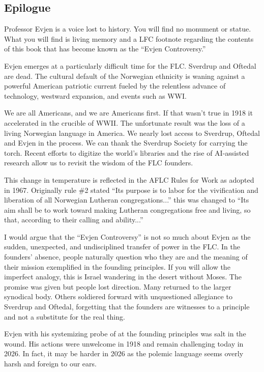\subsection{Epilogue}

Professor Evjen is a voice lost to history. You will find no monument or statue. What you will find is living memory and a LFC footnote regarding the contents of this book that has become known as the ``Evjen Controversy.'' 

Evjen emerges at a particularly difficult time for the FLC. Sverdrup and Oftedal are dead. The cultural default of the Norwegian ethnicity is waning against a powerful American patriotic current fueled by the relentless advance of technology, westward expansion, and events such as WWI. 

We are all Americans, and we are Americans first. If that wasn't true in 1918 it accelerated in the crucible of WWII. The unfortunate result was the loss of a living Norwegian language in America. We nearly lost access to Sverdrup, Oftedal and Evjen in the process. We can thank the Sverdrup Society for carrying the torch. Recent efforts to digitize the world's libraries and the rise of AI-assisted research allow us to revisit the wisdom of the FLC founders.  

This change in temperature is reflected in the AFLC Rules for Work as adopted in 1967. Originally rule \#2 stated ``Its purpose is to labor for the vivification and liberation of all Norwegian Lutheran congregations...'' this was changed to ``Its aim shall be to work toward making Lutheran congregations free and living, so that, according to their calling and ability...''

I would argue that the ``Evjen Controversy'' is not so much about Evjen as the sudden, unexpected, and undisciplined transfer of power in the FLC. In the founders’ absence, people naturally question who they are and the meaning of their mission exemplified in the founding principles. If you will allow the imperfect analogy, this is Israel wandering in the desert without Moses. The promise was given but people lost direction. Many returned to the larger synodical body. Others soldiered forward with unquestioned allegiance to Sverdrup and Oftedal, forgetting that the founders are witnesses to a principle and not a substitute for the real thing. 

Evjen with his systemizing probe of at the founding principles was salt in the wound. His actions were unwelcome in 1918 and remain challenging today in 2026. In fact, it may be harder in 2026 as the polemic language seems overly harsh and foreign to our ears.   

